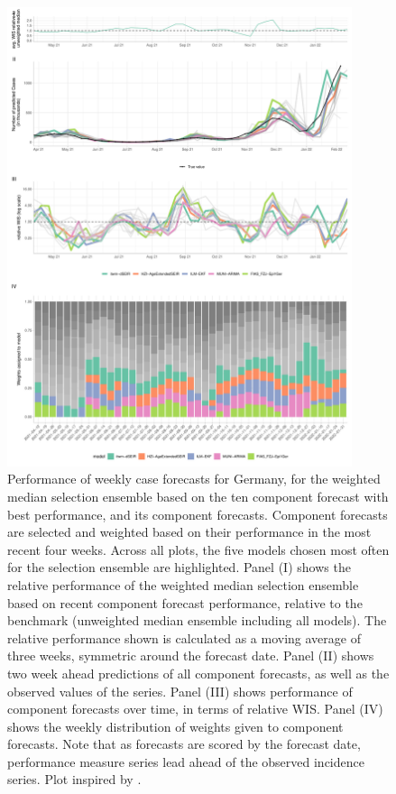 \begin{figure}
\centering
\includegraphics[width = 0.9\textwidth]{../plots/best_performers_weights_de}
\caption{\footnotesize{Performance of weekly case forecasts for Germany, for the weighted median selection ensemble based on the ten component forecast with best performance, and its component forecasts. Component forecasts are selected and weighted based on their performance in the most recent four weeks. Across all plots, the five models chosen most often for the selection ensemble are highlighted. Panel (I) shows the relative performance of the weighted median selection ensemble based on recent component forecast performance, relative to the benchmark (unweighted median ensemble including all models). The relative performance shown is calculated as a moving average of three weeks, symmetric around the forecast date. Panel (II) shows two week ahead predictions of all component forecasts, as well as the observed values of the series. Panel (III) shows performance of component forecasts over time, in terms of relative WIS. Panel (IV) shows the weekly distribution of weights given to component forecasts. Note that as forecasts are scored by the forecast date, performance measure series lead ahead of the observed incidence series. Plot inspired by \cite{ray_comparing_2022}.}}
\label{fig:bpweights_de}
\end{figure}\\
